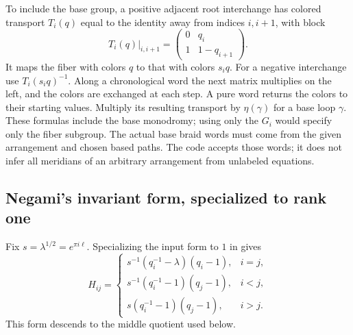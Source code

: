 \documentclass[11pt,a4paper]{article}
\theoremstyle{remark}\newtheorem{remark}[theorem]{Remark}
\begin{document}
To include the base group, a positive adjacent root interchange has
colored transport $T_i(q)$ equal to the identity away from indices
$i,i+1$, with block
\begin{equation}\label{mc:eq:T}
 T_i(q)\big|_{i,i+1}=\begin{pmatrix}0&q_i\\1&1-q_{i+1}\end{pmatrix}.
\end{equation}
It maps the fiber with colors $q$ to that with colors $s_iq$.
For a negative interchange use $T_i(s_iq)^{-1}$.
Along a chronological word the next matrix multiplies on the left,
and the colors are exchanged at each step. A pure word returns the
colors to their starting values. Multiply its resulting transport by
$\eta(\gamma)$ for a base loop $\gamma$. These formulas include the
base monodromy; using only the $G_i$ would specify only the fiber subgroup.
The actual base braid words must come from the given arrangement and
chosen based paths. The code accepts those words; it does not infer
all meridians of an arbitrary arrangement from unlabeled equations.

\subsection{Negami's invariant form, specialized to rank one}
Fix $s=\lambda^{1/2}=e^{\pi i\ell}$. Specializing the input form to $1$
in \cite[Theorems 8--9]{NegamiKZ} gives
\begin{equation}\label{mc:eq:H}
 H_{ij}=\begin{cases}
 s^{-1}(q_i^{-1}-\lambda)(q_i-1),&i=j,\\
 s^{-1}(q_i^{-1}-1)(q_j-1),&i<j,\\
 s(q_i^{-1}-1)(q_j-1),&i>j.
 \end{cases}
\end{equation}
This form descends to the middle quotient used below.
\end{document}
